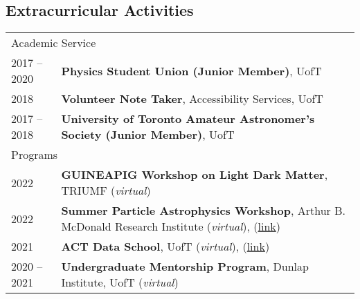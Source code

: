 \documentclass[10pt]{res} %
\begin{document}
\begin{resume}
\begin{table}[h!]
\end{table}



\section{\Large Extracurricular Activities}
\vspace{-5pt} %
\noindent\makebox[\linewidth]{\rule{\textwidth}{0.4pt}}
\vspace{-20pt} %

\begin{table}[h]
\begin{tabularx}{\textwidth}{ @{} p{6.5em} X @{} }

\multicolumn{2}{l}{ \rule{0pt}{3ex} \large \hspace{-12pt} Academic Service \dotfill \rule[-1.2ex]{0pt}{0pt}} \\ 
2017 -- 2020 & \textbf{Physics Student Union (Junior Member)}, UofT \\
2018 & \textbf{Volunteer Note Taker}, Accessibility Services, UofT \\
2017 -- 2018 & \textbf{University of Toronto Amateur Astronomer's Society (Junior Member)}, UofT \\

\multicolumn{2}{l}{ \rule{0pt}{3ex} \large \hspace{-12pt} Programs \dotfill \rule[-1.2ex]{0pt}{0pt}} \\
2022 & \textbf{GUINEAPIG Workshop on Light Dark Matter}, TRIUMF (\textit{virtual}) \\
2022 & \textbf{Summer Particle Astrophysics Workshop}, Arthur B. McDonald Research Institute (\textit{virtual}), (\href{https://indico.cern.ch/event/1151180/registrations/participants}{link}) \\
2021 & \textbf{ACT Data School}, UofT (\textit{virtual}),  (\href{https://sites.google.com/view/actdataschool/participants}{link}) \\
2020 -- 2021 & \textbf{Undergraduate Mentorship Program}, Dunlap Institute, UofT (\textit{virtual}) \\


\end{tabularx}
\end{table}
\end{resume}
\end{document}
